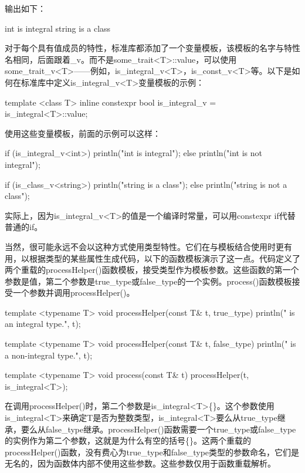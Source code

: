 输出如下：

\begin{shell}
int is integral
string is a class
\end{shell}

对于每个具有值成员的特性，标准库都添加了一个变量模板，该模板的名字与特性名相同，后面跟着\_v。而不是some\_trait<T>::value，可以使用some\_trait\_v<T>——例如，is\_integral\_v<T>，is\_const\_v<T>等。以下是如何在标准库中定义is\_integral\_v<T>变量模板的示例：

\begin{cpp}
template <class T>
inline constexpr bool is_integral_v = is_integral<T>::value;
\end{cpp}

使用这些变量模板，前面的示例可以这样：

\begin{cpp}
if (is_integral_v<int>) { println("int is integral"); }
else { println("int is not integral"); }

if (is_class_v<string>) { println("string is a class"); }
else { println("string is not a class"); }
\end{cpp}

实际上，因为is\_integral\_v<T>的值是一个编译时常量，可以用constexpr if代替普通的if。

当然，很可能永远不会以这种方式使用类型特性。它们在与模板结合使用时更有用，以根据类型的某些属性生成代码，以下的函数模板演示了这一点。代码定义了两个重载的processHelper()函数模板，接受类型作为模板参数。这些函数的第一个参数是值，第二个参数是true\_type或false\_type的一个实例。process()函数模板接受一个参数并调用processHelper()。

\begin{cpp}
template <typename T>
void processHelper(const T& t, true_type)
{
    println("{} is an integral type.", t);
}

template <typename T>
void processHelper(const T& t, false_type)
{
    println("{} is a non-integral type.", t);
}

template <typename T>
void process(const T& t)
{
    processHelper(t, is_integral<T>{});
}
\end{cpp}

在调用processHelper()时，第二个参数是is\_integral<T>\{\}。这个参数使用is\_integral<T>来确定T是否为整数类型，is\_integral<T>要么从true\_type继承，要么从false\_type继承。processHelper()函数需要一个true\_type或false\_type的实例作为第二个参数，这就是为什么有空的括号\{\}。这两个重载的processHelper()函数，没有费心为true\_type和false\_type类型的参数命名，它们是无名的，因为函数体内部不使用这些参数。这些参数仅用于函数重载解析。

